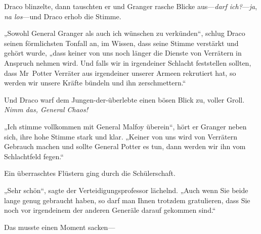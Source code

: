 Draco blinzelte, dann tauschten er und Granger rasche Blicke aus—\emph{darf ich?}—\emph{ja}, \emph{na los}—und Draco erhob die Stimme.

„Sowohl General Granger als auch ich wünschen zu verkünden“, schlug Draco seinen förmlichsten Tonfall an, im Wissen, dass seine Stimme verstärkt und gehört wurde, „dass keiner von uns noch länger die Dienste von Verrätern in Anspruch nehmen wird. Und falls wir in irgendeiner Schlacht feststellen sollten, dass Mr~Potter Verräter aus irgendeiner unserer Armeen rekrutiert hat, so werden wir unsere Kräfte bündeln und ihn zerschmettern.“

Und Draco warf dem Jungen-der-überlebte einen bösen Blick zu, voller Groll. \emph{Nimm das, General Chaos!}

„Ich stimme vollkommen mit General Malfoy überein“, hört er Granger neben sich, ihre hohe Stimme stark und klar. „Keiner von uns wird von Verrätern Gebrauch machen und sollte General Potter es tun, dann werden wir ihn vom Schlachtfeld fegen.“

Ein überraschtes Flüstern ging durch die Schülerschaft.

„Sehr schön“, sagte der Verteidigungsprofessor lächelnd. „Auch wenn Sie beide lange genug gebraucht haben, so darf man Ihnen trotzdem gratulieren, dass Sie noch vor irgendeinem der anderen Generäle darauf gekommen sind.“

Das musste einen Moment sacken—

